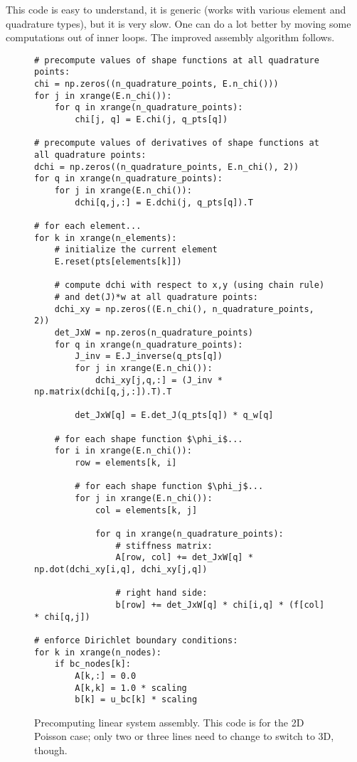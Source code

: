 \documentclass{article}
\begin{document}
This code is easy to understand, it is generic (works with various element and quadrature types), but it is very slow.
One can do a lot better by moving some computations out of inner loops. The improved assembly algorithm follows.

\begin{figure}
  \centering
  \begin{lstlisting}
# precompute values of shape functions at all quadrature points:
chi = np.zeros((n_quadrature_points, E.n_chi()))
for j in xrange(E.n_chi()):
    for q in xrange(n_quadrature_points):
        chi[j, q] = E.chi(j, q_pts[q])

# precompute values of derivatives of shape functions at all quadrature points:
dchi = np.zeros((n_quadrature_points, E.n_chi(), 2))
for q in xrange(n_quadrature_points):
    for j in xrange(E.n_chi()):
        dchi[q,j,:] = E.dchi(j, q_pts[q]).T

# for each element...
for k in xrange(n_elements):
    # initialize the current element
    E.reset(pts[elements[k]])

    # compute dchi with respect to x,y (using chain rule)
    # and det(J)*w at all quadrature points:
    dchi_xy = np.zeros((E.n_chi(), n_quadrature_points,  2))
    det_JxW = np.zeros(n_quadrature_points)
    for q in xrange(n_quadrature_points):
        J_inv = E.J_inverse(q_pts[q])
        for j in xrange(E.n_chi()):
            dchi_xy[j,q,:] = (J_inv * np.matrix(dchi[q,j,:]).T).T

        det_JxW[q] = E.det_J(q_pts[q]) * q_w[q]

    # for each shape function $\phi_i$...
    for i in xrange(E.n_chi()):
        row = elements[k, i]

        # for each shape function $\phi_j$...
        for j in xrange(E.n_chi()):
            col = elements[k, j]

            for q in xrange(n_quadrature_points):
                # stiffness matrix:
                A[row, col] += det_JxW[q] * np.dot(dchi_xy[i,q], dchi_xy[j,q])

                # right hand side:
                b[row] += det_JxW[q] * chi[i,q] * (f[col]  * chi[q,j])

# enforce Dirichlet boundary conditions:
for k in xrange(n_nodes):
    if bc_nodes[k]:
        A[k,:] = 0.0
        A[k,k] = 1.0 * scaling
        b[k] = u_bc[k] * scaling
  \end{lstlisting}
  \caption{Precomputing linear system assembly. This code is for the 2D Poisson case;
    only two or three lines need to change to switch to 3D, though.}
  \label{fig:pythonbetter}
\end{figure}
\end{document}
